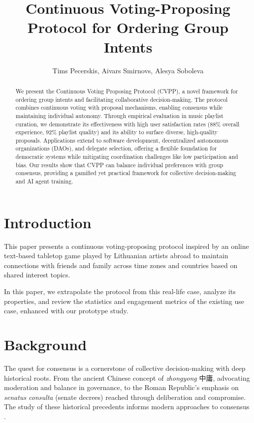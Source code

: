 \documentclass{article}
\title{Continuous Voting-Proposing Protocol for Ordering Group Intents}
\author{Tims Pecerskis, Aivars Smirnovs, Alesya Soboleva}
\begin{document}
\begin{CJK}{UTF8}{gbsn}

    \maketitle

    \begin{abstract}
        We present the Continuous Voting Proposing Protocol (CVPP), a novel framework for ordering group intents and facilitating collaborative decision-making. The protocol combines continuous voting with proposal mechanisms, enabling consensus while maintaining individual autonomy. Through empirical evaluation in music playlist curation, we demonstrate its effectiveness with high user satisfaction rates (88\% overall experience, 92\% playlist quality) and its ability to surface diverse, high-quality proposals. Applications extend to software development, decentralized autonomous organizations (DAOs), and delegate selection, offering a flexible foundation for democratic systems while mitigating coordination challenges like low participation and bias. Our results show that CVPP can balance individual preferences with group consensus, providing a gamified yet practical framework for collective decision-making and AI agent training.
    \end{abstract}
    \begin{multicols}{2}

        \section{Introduction}

        This paper presents a continuous voting-proposing protocol inspired by an online text-based tabletop game played by Lithuanian artists abroad to maintain connections with friends and family across time zones and countries based on shared interest topics.

        In this paper, we extrapolate the protocol from this real-life case, analyze its properties, and review the statistics and engagement metrics of the existing use case, enhanced with our prototype study.

        \section{Background}

        The quest for consensus is a cornerstone of collective decision-making with deep historical roots. From the ancient Chinese concept of \textit{zhongyong} {中庸}, advocating moderation and balance in governance, to the Roman Republic's emphasis on \textit{senatus consulta} (senate decrees) reached through deliberation and compromise. The study of these historical precedents informs modern approaches to consensus \cite{Andersen2019} \cite{Frederic2014}.


\end{multicols}
\end{CJK}
\end{document}
